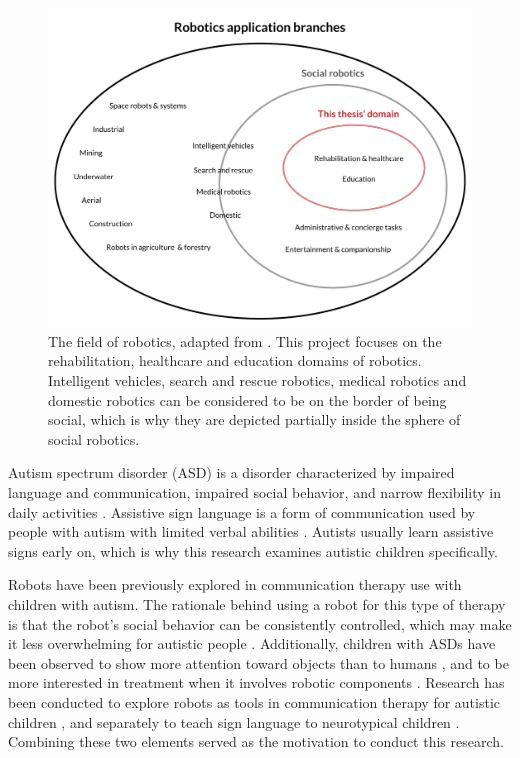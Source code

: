 \begin{figure}
\centering
  \includegraphics[scale=0.45]{images/robotics_application_branches.pdf}
  \caption{The field of robotics, adapted from \cite{Breazeal2008}. This project focuses on the rehabilitation, healthcare and education domains of robotics. Intelligent vehicles, search and rescue robotics, medical robotics and domestic robotics can be considered to be on the border of being social, which is why they are depicted partially inside the sphere of social robotics.}
  \label{fig:fieldRobotics}
\end{figure}

Autism spectrum disorder (ASD) is a disorder characterized by impaired language and communication, impaired social behavior, and narrow flexibility in daily activities \cite{frith2003autism, tetzchner, WHOautism}. Assistive sign language is a form of communication used by people with autism with limited verbal abilities \cite{puheSuomi}. Autists usually learn assistive signs early on, which is why this research examines autistic children specifically. 

Robots have been previously explored in communication therapy use with children with autism. The rationale behind using a robot for this type of therapy is that the robot's social behavior can be consistently controlled, which may make it less overwhelming for autistic people \cite{kozima2009keepon}. Additionally, children with ASDs have been observed to show more attention toward objects than to humans \cite{autismi}, and to be more interested in treatment when it involves robotic components \cite{robins2006appearance}. Research has been conducted to explore robots as tools in communication therapy for autistic children \cite{ARIA, charlie2011, boccanfuso2017low, duquette2008exploring, giullian2010detailed, goodrich2012incorporating, kim2013social, kim2015potential, kozima2009keepon,pop2013social, robins2004effects, robins2006appearance, wainer2014pilot}, and separately to teach sign language to neurotypical children \cite{taleofarobot, uluer2015new}. Combining these two elements served as the motivation to conduct this research. 

